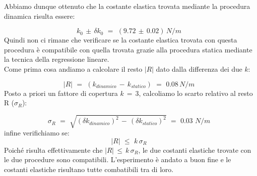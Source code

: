 Abbiamo dunque ottenuto che la costante elastica trovata mediante la procedura dinamica risulta essere:

\begin{equation*}
	k_0 \, \pm \, \delta k_0 \,\,=\,\, (9.72 \, \pm \, 0.02) \, N/m
\end{equation*}
%
Quindi non ci rimane che verificare se la costante elastica trovata con questa procedura è compatibile con quella trovata grazie alla procedura statica mediante la tecnica della regressione lineare.\\
Come prima cosa andiamo a calcolare il resto $|R|$ dato dalla differenza dei due $k$:

\begin{equation*}
	|R| \,\,=\,\, (k_{dinamico} \,-\, k_{statico}) \,\,=\,\, 0.08 \, N/m
\end{equation*}
%
Posto a priori un fattore di copertura $k \,=\, 3$, calcoliamo lo scarto relativo al resto R ($\sigma_R$):

\begin{equation*}
	\sigma_R \,\,=\,\, \sqrt{(\delta k_{dinamico})^2 \,-\, (\delta k_{statico})^2} \,\,=\,\, 0.03 \,\, N/m	
\end{equation*}
%
infine verifichiamo se:
\begin{equation*}
	|R| \,\,\leq\,\, k \, \sigma_R  
\end{equation*}
%
Poiché risulta effettivamente che $|R| \,\leq\, k\,\sigma_R$, le due costanti elastiche trovate con le due procedure sono compatibili.
L'esperimento è andato a buon fine e le costanti elastiche risultano tutte combatibili tra di loro.
